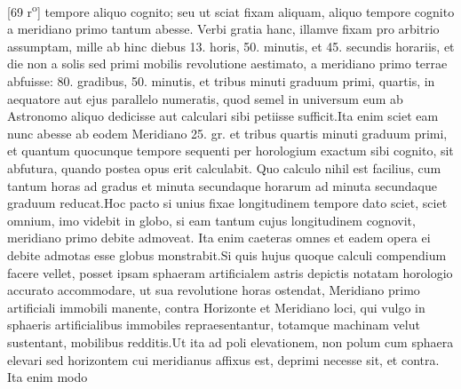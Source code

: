 [69 r\textsuperscript{o}]  tempore aliquo cognito; seu ut sciat fixam\protect{} aliquam, aliquo tempore cognito a meridiano \protect{} primo tantum abesse. Verbi gratia hanc, illamve fixam\protect{} pro arbitrio assumptam, mille ab hinc diebus 13. horis, 50. minutis, et 45. secundis horariis, et die non a solis sed primi mobilis revolutione aestimato, a meridiano\protect{} primo terrae abfuisse: 80. gradibus, 50. minutis, et tribus minuti graduum primi, quartis, in aequatore \protect{} aut ejus parallelo\protect{} numeratis, quod semel in universum eum ab Astronomo aliquo dedicisse aut calculari sibi petiisse sufficit.\pend \pstart Ita enim sciet eam nunc abesse ab eodem Meridiano \protect{} 25. gr. et tribus quartis minuti graduum primi, et quantum quocunque tempore sequenti per horologium\protect{} exactum sibi cognito, sit abfutura, quando postea opus erit calculabit. Quo calculo nihil est facilius, cum tantum horas ad gradus et minuta secundaque horarum ad minuta secundaque graduum reducat.\pend \pstart Hoc pacto si unius fixae\protect{} longitudinem\protect{} tempore dato sciet, sciet omnium, imo videbit in globo, si eam tantum cujus longitudinem\protect{} cognovit, meridiano\protect{} primo debite admoveat. Ita enim caeteras omnes et eadem opera ei debite admotas esse globus monstrabit.\pend \pstart Si quis hujus quoque calculi compendium facere vellet, posset ipsam sphaeram artificialem astris depictis notatam horologio\protect{} accurato accommodare, ut sua revolutione horas ostendat, Meridiano\protect{} primo artificiali immobili manente, contra Horizonte et Meridiano\protect{} loci, qui vulgo in sphaeris artificialibus immobiles repraesentantur, totamque machinam velut sustentant, mobilibus redditis.\pend \pstart Ut ita  ad poli elevationem\protect{}, non polum\protect{} cum sphaera elevari sed horizontem cui meridianus\protect{} affixus est, deprimi necesse sit, et contra. Ita enim modo